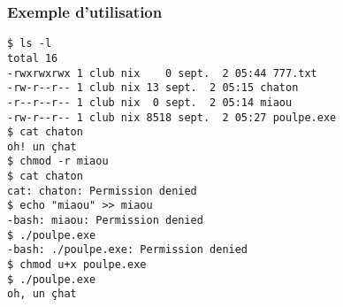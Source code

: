 \subsubsection*{Exemple d'utilisation}
\begin{lstlisting}
$ ls -l
total 16
-rwxrwxrwx 1 club nix    0 sept.  2 05:44 777.txt
-rw-r--r-- 1 club nix 13 sept.  2 05:15 chaton
-r--r--r-- 1 club nix  0 sept.  2 05:14 miaou
-rw-r--r-- 1 club nix 8518 sept.  2 05:27 poulpe.exe
$ cat chaton
oh! un çhat
$ chmod -r miaou
$ cat chaton
cat: chaton: Permission denied
$ echo "miaou" >> miaou 
-bash: miaou: Permission denied
$ ./poulpe.exe 
-bash: ./poulpe.exe: Permission denied
$ chmod u+x poulpe.exe
$ ./poulpe.exe
oh, un çhat
\end{lstlisting}
